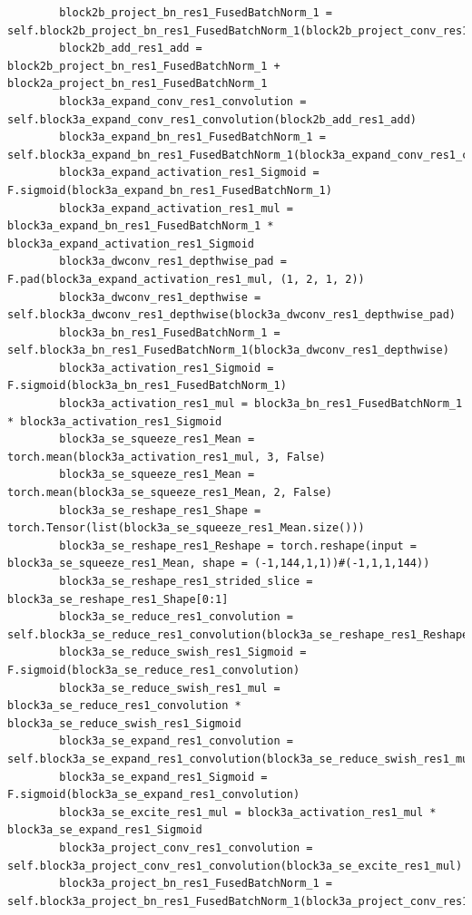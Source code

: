 \documentclass{fisatprojectfinal}
\begin{document}
\begin{appendices}
\begin{lstlisting}
        block2b_project_bn_res1_FusedBatchNorm_1 = self.block2b_project_bn_res1_FusedBatchNorm_1(block2b_project_conv_res1_convolution)
        block2b_add_res1_add = block2b_project_bn_res1_FusedBatchNorm_1 + block2a_project_bn_res1_FusedBatchNorm_1
        block3a_expand_conv_res1_convolution = self.block3a_expand_conv_res1_convolution(block2b_add_res1_add)
        block3a_expand_bn_res1_FusedBatchNorm_1 = self.block3a_expand_bn_res1_FusedBatchNorm_1(block3a_expand_conv_res1_convolution)
        block3a_expand_activation_res1_Sigmoid = F.sigmoid(block3a_expand_bn_res1_FusedBatchNorm_1)
        block3a_expand_activation_res1_mul = block3a_expand_bn_res1_FusedBatchNorm_1 * block3a_expand_activation_res1_Sigmoid
        block3a_dwconv_res1_depthwise_pad = F.pad(block3a_expand_activation_res1_mul, (1, 2, 1, 2))
        block3a_dwconv_res1_depthwise = self.block3a_dwconv_res1_depthwise(block3a_dwconv_res1_depthwise_pad)
        block3a_bn_res1_FusedBatchNorm_1 = self.block3a_bn_res1_FusedBatchNorm_1(block3a_dwconv_res1_depthwise)
        block3a_activation_res1_Sigmoid = F.sigmoid(block3a_bn_res1_FusedBatchNorm_1)
        block3a_activation_res1_mul = block3a_bn_res1_FusedBatchNorm_1 * block3a_activation_res1_Sigmoid
        block3a_se_squeeze_res1_Mean = torch.mean(block3a_activation_res1_mul, 3, False)
        block3a_se_squeeze_res1_Mean = torch.mean(block3a_se_squeeze_res1_Mean, 2, False)
        block3a_se_reshape_res1_Shape = torch.Tensor(list(block3a_se_squeeze_res1_Mean.size()))
        block3a_se_reshape_res1_Reshape = torch.reshape(input = block3a_se_squeeze_res1_Mean, shape = (-1,144,1,1))#(-1,1,1,144))
        block3a_se_reshape_res1_strided_slice = block3a_se_reshape_res1_Shape[0:1]
        block3a_se_reduce_res1_convolution = self.block3a_se_reduce_res1_convolution(block3a_se_reshape_res1_Reshape)
        block3a_se_reduce_swish_res1_Sigmoid = F.sigmoid(block3a_se_reduce_res1_convolution)
        block3a_se_reduce_swish_res1_mul = block3a_se_reduce_res1_convolution * block3a_se_reduce_swish_res1_Sigmoid
        block3a_se_expand_res1_convolution = self.block3a_se_expand_res1_convolution(block3a_se_reduce_swish_res1_mul)
        block3a_se_expand_res1_Sigmoid = F.sigmoid(block3a_se_expand_res1_convolution)
        block3a_se_excite_res1_mul = block3a_activation_res1_mul * block3a_se_expand_res1_Sigmoid
        block3a_project_conv_res1_convolution = self.block3a_project_conv_res1_convolution(block3a_se_excite_res1_mul)
        block3a_project_bn_res1_FusedBatchNorm_1 = self.block3a_project_bn_res1_FusedBatchNorm_1(block3a_project_conv_res1_convolution)

\end{lstlisting}
\end{appendices}
\end{document}
